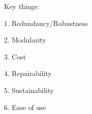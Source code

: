 Key things:

1. Redundancy/Robustness

2. Modularity

3. Cost

4. Repairability

5. Sustainability

6. Ease of use
